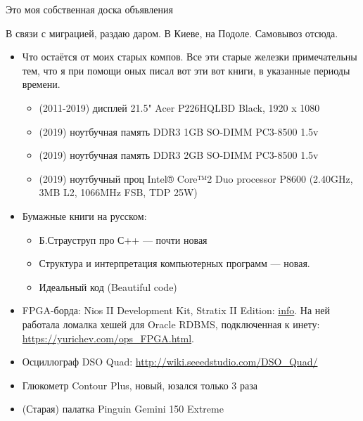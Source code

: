
\begin{center}
\LARGE{} Это моя собственная доска объявления \normalsize{}
\end{center}

\myhrule{}

В связи с миграцией, раздаю даром. В Киеве, на Подоле. Самовывоз отсюда.

\begin{itemize}
\item Что остаётся от моих старых компов.
Все эти старые железки примечательны тем, что я при помощи оных писал вот эти вот книги, в указанные периоды времени.
\begin{itemize}
\item (2011-2019) дисплей 21.5" Acer P226HQLBD Black, 1920 x 1080
\item (2019) ноутбучная память DDR3 1GB SO-DIMM PC3-8500 1.5v
        \item (2019) ноутбучная память DDR3 2GB SO-DIMM PC3-8500 1.5v
        \item (2019) ноутбучный проц Intel® Core™2 Duo processor P8600 (2.40GHz, 3MB L2, 1066MHz FSB, TDP 25W)
        \end{itemize}

        \item Бумажные книги на русском:
        \begin{itemize}
        \item Б.Страуструп про С++ --- почти новая
        \item Структура и интерпретация компьютерных программ --- новая.
        \item Идеальный код (Beautiful code)
        \end{itemize}

        \item FPGA-борда: Nios II Development Kit, Stratix II Edition: \href{https://www.intel.com/content/www/us/en/programmable/products/boards_and_kits/dev-kits/altera/kit-niosii-2s60.html}{info}.
        На ней работала ломалка хешей для Oracle RDBMS, подключенная к инету: \url{https://yurichev.com/ops_FPGA.html}.
        \item Осциллограф DSO Quad: \url{http://wiki.seeedstudio.com/DSO_Quad/}
        \item Глюкометр Contour Plus, новый, юзался только 3 раза

        \item (Старая) палатка Pinguin Gemini 150 Extreme

        \end{itemize}

